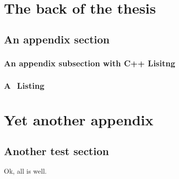 \documentclass[11pt,a4paper,openany,oneside]{MScThesis}
\begin{document}
%
    \cleardoublepage
    \printbibliography %


\appendix

    \chapter{The back of the thesis}

    \section{An appendix section}

    \subsection{An appendix subsection with C++ Lisitng}

   

    \subsection{A \matlab $ $ Listing}

 

    \chapter{Yet another appendix}

    \section{Another test section}

    Ok, all is well.

    \printindex
    \cleardoublepage
\end{document}
